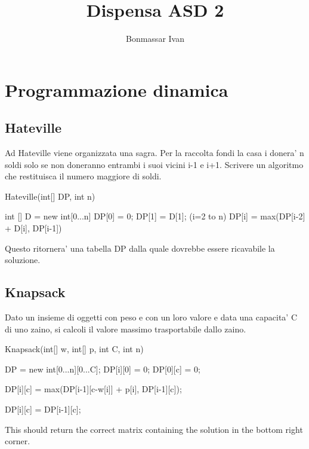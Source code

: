 \documentclass[oneside]{book}
\title {Dispensa ASD 2}
\author{Bonmassar Ivan}
\begin{document}
\maketitle
\tableofcontents


\chapter{Programmazione dinamica}
\section{Hateville}

Ad Hateville viene organizzata una sagra. Per la raccolta fondi la casa i donera' n soldi solo se non doneranno entrambi i suoi vicini i-1 e i+1. Scrivere un algoritmo che restituisca il numero maggiore di soldi.

\begin{algorithm}
\caption{Hateville(int[] DP, int n)}\label{alg:cap}
\begin{algorithmic}
\State int [] D = new int[0...n]
\State DP[0] = 0;
\State DP[1] = D[1];
\For (i=2 to n)
	\State DP[i] = max(DP[i-2] + D[i], DP[i-1])
\EndFor
\end{algorithmic}
\end{algorithm}

Questo ritornera' una tabella DP dalla quale dovrebbe essere ricavabile la soluzione.

\newpage
\section{Knapsack}
Dato un insieme di oggetti con peso e con un loro valore e data una capacita' C di uno zaino, si calcoli il valore massimo trasportabile dallo zaino.

\begin{algorithm}
\caption{Knapsack(int[] w, int[] p, int C, int n)}\label{alg:cap}
\begin{algorithmic}
\State 	DP = new int[0...n][0...C];
	\State DP[i][0] = 0;
\EndFor
{}
\State DP[0][c] = 0;
\EndFor

			\State DP[i][c] = max(DP[i-1][c-w[i]] + p[i], DP[i-1][c]);
		
		\Else 	
			\State DP[i][c] = DP[i-1][c];	
		\EndIf
		
	\EndFor
\EndFor	

\end{algorithmic}
\end{algorithm}

This should return the correct matrix containing the solution in the bottom right corner.
\end{document}
